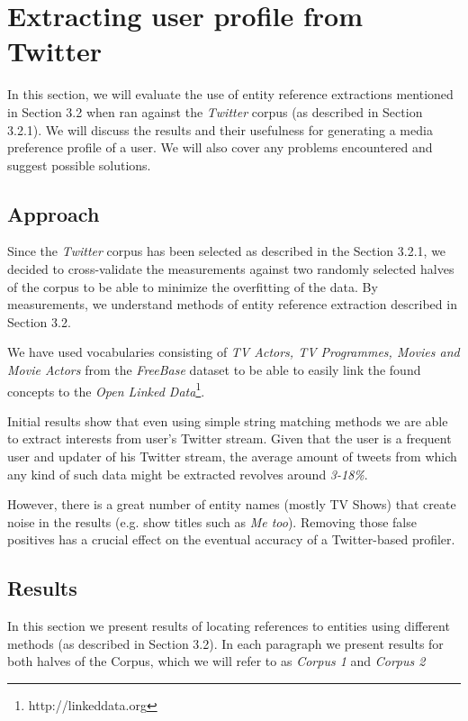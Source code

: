 \section{Extracting user profile from Twitter}

In this section, we will evaluate the use of entity reference extractions
mentioned in Section 3.2 when ran against the \textit{Twitter} corpus (as described in Section 3.2.1).
We will discuss the results and their usefulness for generating a media preference profile of a user.
We will also cover any problems encountered and suggest possible solutions.

\subsection{Approach}
Since the \textit{Twitter} corpus has been selected as described in the Section 3.2.1,
we decided to cross-validate the measurements against two randomly selected halves of the corpus
to be able to minimize the overfitting of the data. By measurements, we understand methods of
entity reference extraction described in Section 3.2.

We have used vocabularies consisting of \textit{TV Actors, TV Programmes, Movies and Movie Actors} from
the \textit{FreeBase} dataset to be able to easily link the found concepts to the \textit{Open Linked Data}\footnote{http://linkeddata.org}.

Initial results show that even using simple string matching methods we are able to extract interests from
user's Twitter stream. Given that the user is a frequent user and updater of his Twitter stream, the average amount of tweets from which any kind of such data might be extracted revolves around \textit{3-18\%}.

However, there is a great number of entity names (mostly TV Shows) that create noise in the results (e.g. show titles such as \textit{Me too}). Removing those false positives has a crucial effect on the eventual accuracy of a Twitter-based profiler.

\subsection{Results}
In this section we present results of locating references to entities using different methods (as described in Section 3.2).
In each paragraph we present results for both halves of the Corpus, which we will refer to as \textit{Corpus 1} and
\textit{Corpus 2}

